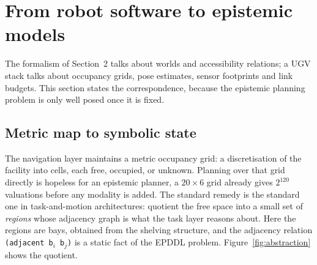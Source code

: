 \documentclass[11pt,a4paper]{article}
\theoremstyle{definition}
\begin{document}
\section{From robot software to epistemic models}
\label{sec:abstraction}

The formalism of Section~2 talks about worlds and accessibility relations; a
UGV stack talks about occupancy grids, pose estimates, sensor footprints and
link budgets. This section states the correspondence, because the epistemic
planning problem is only well posed once it is fixed.

\subsection{Metric map to symbolic state}

The navigation layer maintains a metric occupancy grid: a discretisation of the
facility into cells, each free, occupied, or unknown. Planning over that grid
directly is hopeless for an epistemic planner, a $20\times 6$ grid already
gives $2^{120}$ valuations before any modality is added. The standard remedy is
the standard one in task-and-motion architectures: quotient the free space into
a small set of \emph{regions} whose adjacency graph is what the task layer
reasons about. Here the regions are bays, obtained from the shelving structure,
and the adjacency relation \texttt{(adjacent b$_i$ b$_j$)} is a static fact of
the EPDDL problem. Figure~\ref{fig:abstraction} shows the quotient.
\end{document}
